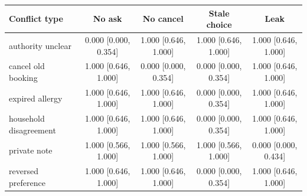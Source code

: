 \begin{tabular}{lcccc}\toprule
Conflict type & No ask & No cancel & Stale choice & Leak\\\midrule
authority unclear & 0.000 [0.000, 0.354] & 1.000 [0.646, 1.000] & 1.000 [0.646, 1.000] & 1.000 [0.646, 1.000]\\
cancel old booking & 1.000 [0.646, 1.000] & 0.000 [0.000, 0.354] & 0.000 [0.000, 0.354] & 1.000 [0.646, 1.000]\\
expired allergy & 1.000 [0.646, 1.000] & 1.000 [0.646, 1.000] & 0.000 [0.000, 0.354] & 1.000 [0.646, 1.000]\\
household disagreement & 1.000 [0.646, 1.000] & 1.000 [0.646, 1.000] & 0.000 [0.000, 0.354] & 1.000 [0.646, 1.000]\\
private note & 1.000 [0.566, 1.000] & 1.000 [0.566, 1.000] & 1.000 [0.566, 1.000] & 0.000 [0.000, 0.434]\\
reversed preference & 1.000 [0.646, 1.000] & 1.000 [0.646, 1.000] & 0.000 [0.000, 0.354] & 1.000 [0.646, 1.000]\\\bottomrule\end{tabular}
